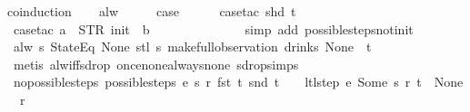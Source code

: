\begin{isabellebody}
%
\isadelimproof
%
\endisadelimproof
%
\isatagproof
{}\isamarkupfalse%
{\isacharparenleft}coinduction{\isacharparenright}\isanewline
\ \ \isamarkupfalse%
\ alw\isanewline
\ \ \isamarkupfalse%
\ \isamarkupfalse%
\ {\isacharquery}case\isanewline
\ \ \ \ \isamarkupfalse%
\ {\isacharparenleft}case{\isacharunderscore}tac\ {\isachardoublequoteopen}shd\ t{\isachardoublequoteclose}{\isacharparenright}\isanewline
\ \ \ \ \isamarkupfalse%
\ {\isacharparenleft}case{\isacharunderscore}tac\ {\isachardoublequoteopen}a\ {\isacharequal}\ STR\ {\isacharprime}{\isacharprime}init{\isacharprime}{\isacharprime}\ {\isasymand}\ b\ {\isacharequal}\ {\isacharbrackleft}{\isacharbrackright}{\isachardoublequoteclose}{\isacharparenright}\isanewline
\ \ \ \ \ \isamarkupfalse%
\isanewline
\ \ \ \ \ \isamarkupfalse%
\ {\isacharparenleft}simp\ add{\isacharcolon}\ possible{\isacharunderscore}steps{\isacharunderscore}not{\isacharunderscore}init{\isacharparenright}\isanewline
\ \ \ \ \isamarkupfalse%
%
\endisatagproof
{\isafoldproof}%
%
\isadelimproof
\isanewline
%
\endisadelimproof
\isanewline
\isanewline
{}\isamarkupfalse%
\ {\isachardoublequoteopen}alw\ {\isacharparenleft}{\isasymlambda}s{\isachardot}\ StateEq\ None\ {\isacharparenleft}stl\ s{\isacharparenright}{\isacharparenright}\ {\isacharparenleft}make{\isacharunderscore}full{\isacharunderscore}observation\ drinks\ None\ {\isacharless}{\isachargreater}\ t{\isacharparenright}{\isachardoublequoteclose}\isanewline
%
\isadelimproof
\ \ %
\endisadelimproof
%
\isatagproof
{}\isamarkupfalse%
\ {\isacharparenleft}metis\ alw{\isacharunderscore}iff{\isacharunderscore}sdrop\ once{\isacharunderscore}none{\isacharunderscore}always{\isacharunderscore}none\ sdrop{\isacharunderscore}simps{\isacharparenleft}{}{\isacharparenright}{\isacharparenright}%
\endisatagproof
{\isafoldproof}%
%
\isadelimproof
\isanewline
%
\endisadelimproof
\isanewline
{}\isamarkupfalse%
\ no{\isacharunderscore}possible{\isacharunderscore}steps{\isacharcolon}\ {\isachardoublequoteopen}possible{\isacharunderscore}steps\ e\ s\ r\ {\isacharparenleft}fst\ t{\isacharparenright}\ {\isacharparenleft}snd\ t{\isacharparenright}\ {\isacharequal}\ {\isacharbraceleft}{\isacharbar}{\isacharbar}{\isacharbraceright}\ {\isasymLongrightarrow}\ ltl{\isacharunderscore}step\ e\ {\isacharparenleft}Some\ s{\isacharparenright}\ r\ t\ {\isacharequal}\ {\isacharparenleft}None{\isacharcomma}\ {\isacharbrackleft}{\isacharbrackright}{\isacharcomma}\ r{\isacharparenright}{\isachardoublequoteclose}\isanewline

\end{isabellebody}
